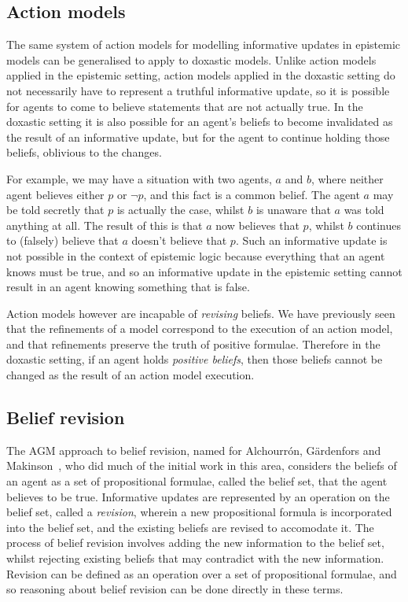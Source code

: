 \subsection{Action models}

The same system of action models for modelling informative updates in epistemic
models can be generalised to apply to doxastic models. Unlike action models
applied in the epistemic setting, action models applied in the doxastic setting
do not necessarily have to represent a truthful informative update, so it is
possible for agents to come to believe statements that are not actually true.
In the doxastic setting it is also possible for an agent's beliefs to become
invalidated as the result of an informative update, but for the agent to
continue holding those beliefs, oblivious to the changes. 

For example, we may have a situation with two agents, $a$ and $b$, where neither
agent believes either $p$ or $\neg p$, and this fact is a common belief. The
agent $a$ may be told secretly that $p$ is actually the case, whilst $b$ is
unaware that $a$ was told anything at all. The result of this is that $a$ now
believes that $p$, whilst $b$ continues to (falsely) believe that $a$ doesn't
believe that $p$. Such an informative update is not possible in the context of
epistemic logic because everything that an agent knows must be true, and so an
informative update in the epistemic setting cannot result in an agent knowing
something that is false.

Action models however are incapable of {\em revising} beliefs. We have
previously seen that the refinements of a model correspond to the execution of
an action model, and that refinements preserve the truth of positive formulae.
Therefore in the doxastic setting, if an agent holds {\em positive beliefs},
then those beliefs cannot be changed as the result of an action model execution.

\subsection{Belief revision}

The AGM approach to belief revision, named for Alchourrón, Gärdenfors and
Makinson~\cite{alchourron1985logic}, who did much of the initial work in this
area, considers the beliefs of an agent as a set of propositional formulae,
called the belief set, that the agent believes to be true. Informative updates
are represented by an operation on the belief set, called a {\em revision},
wherein a new propositional formula is incorporated into the belief set, and the
existing beliefs are revised to accomodate it. The process of belief revision
involves adding the new information to the belief set, whilst rejecting existing
beliefs that may contradict with the new information. Revision can be
defined as an operation over a set of propositional formulae, and so reasoning
about belief revision can be done directly in these terms. %

